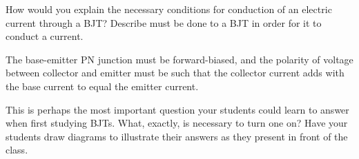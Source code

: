

How would you explain the necessary conditions for conduction of an electric current through a BJT?  Describe must be done to a BJT in order for it to conduct a current.







The base-emitter PN junction must be forward-biased, and the polarity of voltage between collector and emitter must be such that the collector current adds with the base current to equal the emitter current.







This is perhaps the most important question your students could learn to answer when first studying BJTs.  What, exactly, is necessary to turn one on?  Have your students draw diagrams to illustrate their answers as they present in front of the class.




